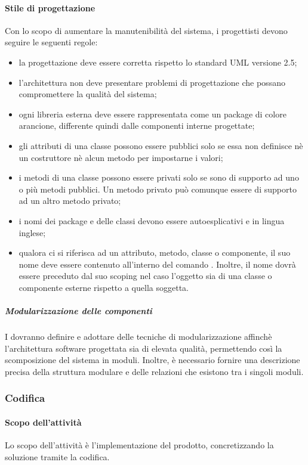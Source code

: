  \paragraph{Stile di progettazione}
 Con lo scopo di aumentare la manutenibilità del sistema, i progettisti devono seguire
 le seguenti regole:
 \begin{itemize}
 	\item la progettazione deve essere corretta rispetto lo standard UML versione 2.5;
 	\item l’architettura non deve presentare problemi di progettazione che possano compromettere la qualità del sistema;
 	\item ogni libreria esterna deve essere rappresentata come un package di colore arancione, differente quindi dalle componenti interne progettate;
 	\item gli attributi di una classe possono essere pubblici solo se essa non definisce nè un costruttore nè alcun metodo per impostarne i valori;
 	\item i metodi di una classe possono essere privati solo se sono di supporto ad uno o più metodi pubblici. Un metodo privato può comunque essere di supporto ad un altro metodo privato;
 	\item i nomi dei package e delle classi devono essere autoesplicativi e in lingua inglese;
 	\item qualora ci si riferisca ad un attributo, metodo, classe o componente, il suo nome deve essere contenuto all'interno del comando . Inoltre, il nome dovrà essere preceduto dal suo scoping nel caso l'oggetto sia di una classe o componente esterne rispetto a quella soggetta.
 \end{itemize}
 \subparagraph{Modularizzazione delle componenti}
 I \PJP{} dovranno definire e adottare delle tecniche di modularizzazione affinchè l’architettura software progettata sia di elevata qualità, permettendo così la scomposizione del sistema in moduli. Inoltre, è necessario fornire una descrizione precisa della struttura modulare e delle relazioni che esistono tra i singoli moduli.
 
 \subsubsection{Codifica}
 \paragraph{Scopo dell'attività}
 Lo scopo dell'attività è l'implementazione del prodotto, concretizzando la soluzione tramite la codifica.
